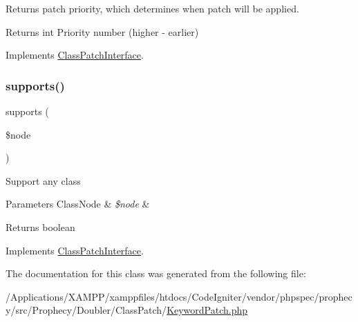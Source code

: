 Returns patch priority, which determines when patch will be applied.

\begin{DoxyReturn}{Returns}
int Priority number (higher -\/ earlier) 
\end{DoxyReturn}


Implements \mbox{\hyperlink{interface_prophecy_1_1_doubler_1_1_class_patch_1_1_class_patch_interface_a1e7a3c168dcd0901a0d2669c67575b55}{Class\+Patch\+Interface}}.

\mbox{\label{class_prophecy_1_1_doubler_1_1_class_patch_1_1_keyword_patch_a99b2455ac194faf79aff042c55719ac2}} 
\subsubsection{\texorpdfstring{supports()}{supports()}}
{\footnotesize\ttfamily supports (\begin{DoxyParamCaption}\item[{\mbox{\hyperlink{class_prophecy_1_1_doubler_1_1_generator_1_1_node_1_1_class_node}{Class\+Node}}}]{\$node }\end{DoxyParamCaption})}

Support any class


\begin{DoxyParams}[1]{Parameters}
Class\+Node & {\em \$node} & \\
\hline
\end{DoxyParams}
\begin{DoxyReturn}{Returns}
boolean 
\end{DoxyReturn}


Implements \mbox{\hyperlink{interface_prophecy_1_1_doubler_1_1_class_patch_1_1_class_patch_interface_a99b2455ac194faf79aff042c55719ac2}{Class\+Patch\+Interface}}.



The documentation for this class was generated from the following file\+:\begin{DoxyCompactItemize}
\item 
/\+Applications/\+X\+A\+M\+P\+P/xamppfiles/htdocs/\+Code\+Igniter/vendor/phpspec/prophecy/src/\+Prophecy/\+Doubler/\+Class\+Patch/\mbox{\hyperlink{_keyword_patch_8php}{Keyword\+Patch.\+php}}\end{DoxyCompactItemize}
